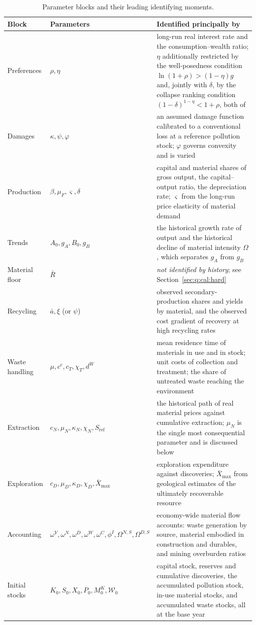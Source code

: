 \begin{table}[H]
\centering
\caption{Parameter blocks and their leading identifying moments.}\label{tab:q:cal}
\begin{tabular}{L{3.1cm}L{4.2cm}L{6.4cm}}
\toprule
Block & Parameters & Identified principally by \\
\midrule
Preferences &
$\rho,\eta$ &
long-run real interest rate and the consumption--wealth ratio; $\eta$ additionally restricted by the well-posedness condition $\ln\left(1+\rho\right)>\left(1-\eta\right)g$ and, jointly with $\delta$, by the collapse ranking condition $\left(1-\delta\right)^{1-\eta}<1+\rho$, both of  \\
Damages &
$\kappa,\psi,\varphi$ &
an assumed damage function calibrated to a conventional loss at a reference pollution stock; $\varphi$ governs convexity and is varied \\
Production &
$\beta,\mu_F,\varsigma,\delta$ &
capital and material shares of gross output, the capital--output ratio, the depreciation rate; $\varsigma$ from the long-run price elasticity of material demand \\
Trends &
$A_0,g_A,B_0,g_B$ &
the historical growth rate of output and the historical decline of material intensity $\Omega$, which separates $g_A$ from $g_B$ \\
Material floor &
$\bar R$ &
\emph{not identified by history}; see Section~\ref{sec:q:cal:hard} \\
Recycling &
$\bar a,\xi$ (or $\psi$) &
observed secondary-production shares and yields by material, and the observed cost gradient of recovery at high recycling rates \\
Waste handling &
$\mu,c^c,c_T,\chi_T,d^W$ &
mean residence time of materials in use and in stock; unit costs of collection and treatment; the share of untreated waste reaching the environment \\
Extraction &
$c_N,\mu_N,\kappa_N,\chi_N,S_{\mathrm{ref}}$ &
the historical path of real material prices against cumulative extraction; $\mu_N$ is the single most consequential parameter and is discussed below \\
Exploration &
$c_D,\mu_D,\kappa_D,\chi_D,\bar X_{\max}$ &
exploration expenditure against discoveries; $\bar X_{\max}$ from geological estimates of the ultimately recoverable resource \\
Accounting &
$\omega^Y,\omega^N,\omega^D,\omega^W,\omega^C,\phi^I,\Omega^{N,S},\Omega^{D,S}$ &
economy-wide material flow accounts: waste generation by source, material embodied in construction and durables, and mining overburden ratios \\
Initial stocks &
$K_0,S_0,X_0,P_0,M^K_0,\mathcal W_0$ &
capital stock, reserves and cumulative discoveries, the accumulated pollution stock, in-use material stocks, and accumulated waste stocks, all at the base year \\
\bottomrule
\end{tabular}
\end{table}

